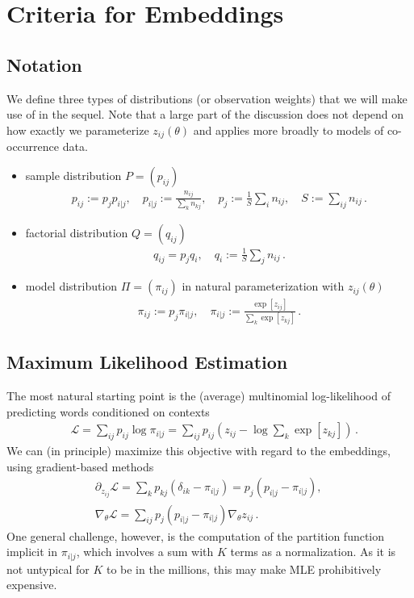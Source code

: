 \documentclass{article}
\newcommand{\logl}{{\mathcal L}}
\begin{document}
\section{Criteria for Embeddings} 

\subsection{Notation}
We define three types of distributions (or observation weights) that we will make use of in the sequel. Note that a large part of the discussion does not depend on how exactly we parameterize $z_{ij}(\theta)$ and applies more broadly to models of co-occurrence data. 
\begin{itemize}
\item sample distribution $P = (p_{ij})$
\begin{align}
p_{ij} := p_j p_{i|j},
\quad p_{i|j} := \frac{n_{ij}}{\sum_{k} n_{kj}}, \quad p_j := \frac1S \sum_{i} n_{ij}, \quad S := \sum_{ij} n_{ij} \,.
\end{align}
\item factorial distribution $Q=(q_{ij})$
\begin{align}
q_{ij} = p_j q_{i}, \quad q_{i} := \frac{1}{S} \sum_j n_{ij}\,.
\end{align}
\item model distribution $\Pi = (\pi_{ij})$ in natural parameterization with $z_{ij}(\theta)$ 
\begin{align}
\pi_{ij} := p_j  \pi_{i|j} , \quad \pi_{i|j} := \frac{ \exp[z_{ij}] }{ \sum_k \exp[z_{kj}] } \,.
\end{align}
\end{itemize}

\subsection{Maximum Likelihood Estimation}

The most natural starting point is the (average) multinomial log-likelihood of predicting words conditioned on contexts
\begin{align}
& \logl = \sum_{ij} p_{ij} \log \pi_{i|j} =  \sum_{ij} p_{ij} \left( z_{ij} - \log \sum_{k} \exp[z_{kj}] \right)\,.
\end{align}
We can (in principle) maximize this objective with regard to the embeddings, using gradient-based methods
\begin{align}
& \partial_{z_{ij}} \logl  =  %
\sum_{k} p_{kj} (\delta_{ik}-\pi_{i|j}) = p_j \left( p_{i|j} - \pi_{i|j} \right), \quad  \\
& \nabla_{\theta} \logl = \sum_{ij}p_j \left( p_{i|j} - \pi_{i|j} \right) \nabla_\theta z_{ij} \,.
\label{eq:mle}
\end{align}
One general challenge, however,  is the computation of the partition function implicit in $\pi_{i|j}$, which involves a sum with $K$ terms as a normalization. As it is not untypical for $K$ to be in the millions, this may make MLE prohibitively expensive.\\
\end{document}
